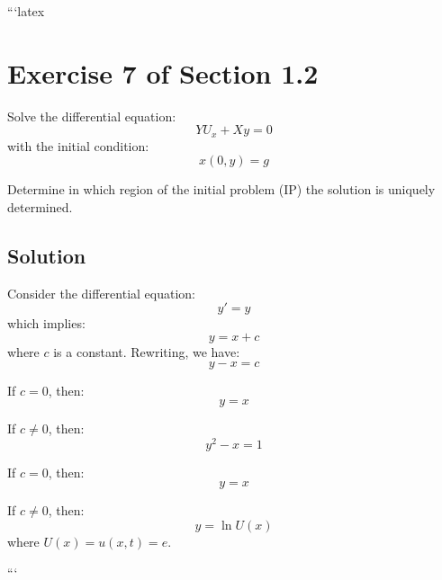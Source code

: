 ```latex
\section*{Exercise 7 of Section 1.2}

Solve the differential equation:
\begin{equation}
    Y U_x + X y = 0
\end{equation}
with the initial condition:
\begin{equation}
    x(0, y) = g
\end{equation}

Determine in which region of the initial problem (IP) the solution is uniquely determined.

\subsection*{Solution}

Consider the differential equation:
\begin{equation}
    y' = y
\end{equation}
which implies:
\begin{equation}
    y = x + c
\end{equation}
where \( c \) is a constant. Rewriting, we have:
\begin{equation}
    y - x = c
\end{equation}

If \( c = 0 \), then:
\begin{equation}
    y = x
\end{equation}

If \( c \neq 0 \), then:
\begin{equation}
    y^2 - x = 1
\end{equation}

If \( c = 0 \), then:
\begin{equation}
    y = x
\end{equation}

If \( c \neq 0 \), then:
\begin{equation}
    y = \ln U(x)
\end{equation}
where \( U(x) = u(x, t) = e \).

```

